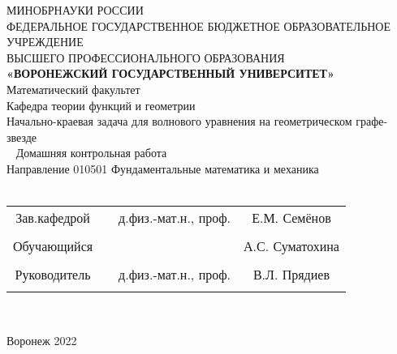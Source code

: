 \documentclass[a4paper, 12pt,fleqn]{extarticle}
\begin{document}
\begin{center}
    \hfill \break
    \large{МИНОБРНАУКИ РОССИИ}\\
    \footnotesize{ФЕДЕРАЛЬНОЕ ГОСУДАРСТВЕННОЕ БЮДЖЕТНОЕ ОБРАЗОВАТЕЛЬНОЕ УЧРЕЖДЕНИЕ}\\ 
    \footnotesize{ВЫСШЕГО ПРОФЕССИОНАЛЬНОГО ОБРАЗОВАНИЯ}\\
    \small{\textbf{«ВОРОНЕЖСКИЙ ГОСУДАРСТВЕННЫЙ УНИВЕРСИТЕТ»}}\\
    \hfill \break
    \normalsize{Математический факультет}\\
     \hfill \break
    \normalsize{Кафедра теории функций и геометрии}\\
    \hfill\break
    \hfill \break
    \hfill \break
    \hfill \break
    \large{Начально-краевая задача для волнового уравнения на геометрическом графе-звезде}\\
    \hfill \break
    \hfill \break
    \hfill \break\
    \hfill \break
    \hfill \break
    \normalsize{Домашняя контрольная работа\\
    \hfill \break
    Направление  010501 Фундаментальные математика и механика\\

    \hfill \break
    }\\
    \hfill \break
    \hfill \break
    \end{center}
    \hfill \break
     
    \normalsize{ 
    \begin{tabular}{cccc}
    Зав.кафедрой & \underline{\hspace{3cm}} &  д.физ.-мат.н.,  проф. & Е.М. Семёнов \\\\
    Обучающийся & \underline{\hspace{3cm}} & &А.С. Суматохина \\\\
    Руководитель & \underline{\hspace{3cm}}&  д.физ.-мат.н.,  проф. & В.Л. Прядиев \\\\
    \end{tabular}
    }\\
    \hfill \break
    \hfill \break
    \hfill \break
    \hfill \break
    \hfill \break
    \hfill \break
    \hfill \break
    \hfill \break
    \hfill \break
    \hfill \break
    \begin{center} Воронеж 2022 \end{center}
    \thispagestyle{empty} %
     
\end{document}
